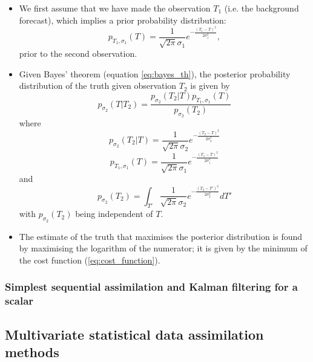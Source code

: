 \begin{itemize}
    \item We first assume that we have made the observation $T_1$ (i.e. the background forecast), which implies a prior probability distribution:
    \begin{equation}
        p_{T_1, \sigma_1} \left( T \right) = 
        \frac{1}{\sqrt{2 \pi} \sigma_1} e^{-\frac{\left( T_1 - T \right)^2}{2 \sigma_1^2}},
    \end{equation}
    prior to the second observation.
    \item Given Bayes' theorem (equation \ref{eq:bayes_th}), the posterior probability distribution of the truth given observation $T_2$ is given by
    \begin{equation}
        p_{\sigma_2} \left( T | T_2 \right) = 
        \frac{p_{\sigma_2} \left( T_2 | T \right) p_{T_1, \sigma_1} \left( T \right)}{p_{\sigma_2} \left( T_2 \right)}
    \end{equation}
    where
    \begin{equation}
        p_{\sigma_2} \left( T_2 | T \right)
        =
        \frac{1}{\sqrt{2 \pi} \sigma_2} e^{-\frac{\left(T_2 - T \right)^2}{2\sigma_2^2}}
    \end{equation}
    \begin{equation}
        p_{T_1, \sigma_1} \left( T \right)
        =
        \frac{1}{\sqrt{2 \pi} \sigma_1} e^{-\frac{\left(T_1 - T \right)^2}{2\sigma_1^2}}
    \end{equation}
    and
    \begin{equation}
        p_{\sigma_2} \left(T_2\right)
        =
        \int_{T'} \frac{1}{\sqrt{2\pi} \sigma_2} e^{-\frac{\left( T_2 - T' \right)^2}{2\sigma_2^2}} dT'
    \end{equation}
    with $p_{\sigma_2} \left(T_2\right)$ being independent of $T$.
    \item The estimate of the truth that maximises the posterior distribution is found by maximising the logarithm of the numerator; it is given by the minimum of the cost function (\ref{eq:cost_function}).
\end{itemize}

\subsubsection{Simplest sequential assimilation and Kalman filtering for a scalar}
\label{subs:squares:sequential}

\subsection{Multivariate statistical data assimilation methods}
\label{sub:data_assimilation:multivar}

